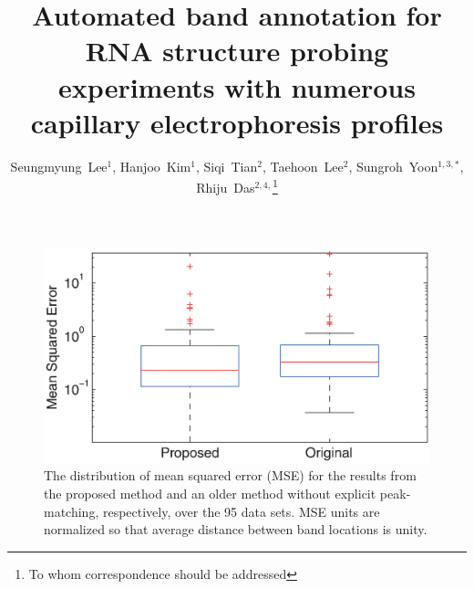\documentclass[letter]{bioinfo}
\begin{document}

\title[Automated band annotation for capillary electrophoresis]{Automated band annotation for RNA structure probing experiments with numerous capillary electrophoresis profiles}
\author[Lee \textit{et~al}]
{
Seungmyung~Lee$^{1}$,
Hanjoo~Kim$^{1}$,
Siqi~Tian$^{2}$,
Taehoon~Lee$^{2}$,
Sungroh~Yoon$^{1,3,*}$,
Rhiju~Das$^{2,4,}$\footnote{To whom correspondence should be addressed}
}
\address{
$^{1}$Department of ECE, Seoul National University, Seoul 151-744, Korea
$^{2}$Department of Biochemistry, Stanford University School of Medicine, Stanford, CA 94305, USA
$^{3}$Interdisciplinary Program in Bionformatics, Seoul National University, Seoul 151-744, Korea
$^{4}$Department of Physics, Stanford University, Stanford, CA 94305, USA
}

\history{}


\maketitle


\begin{figure}
\centering
\includegraphics[width=\linewidth]{figures/supp_old_new_comparison}
\caption{The distribution of mean squared error (MSE) for the results from the proposed method and an older method without explicit peak-matching, respectively, over the 95 data sets. MSE units are normalized so that average distance between band locations is unity.}
\label{f:old_vs_new}
\end{figure}
\end{document}
